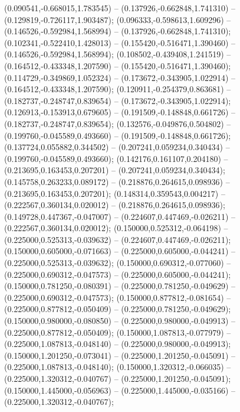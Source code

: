  (0.090541,-0.668015,1.783545) -- (0.137926,-0.662848,1.741310) -- (0.129819,-0.726117,1.903487);
 (0.096333,-0.598613,1.609296) -- (0.146526,-0.592984,1.568994) -- (0.137926,-0.662848,1.741310);
 (0.102341,-0.522410,1.428013) -- (0.155420,-0.516471,1.390460) -- (0.146526,-0.592984,1.568994);
 (0.108502,-0.439408,1.241519) -- (0.164512,-0.433348,1.207590) -- (0.155420,-0.516471,1.390460);
 (0.114729,-0.349869,1.052324) -- (0.173672,-0.343905,1.022914) -- (0.164512,-0.433348,1.207590);
 (0.120911,-0.254379,0.863681) -- (0.182737,-0.248747,0.839654) -- (0.173672,-0.343905,1.022914);
 (0.126913,-0.153913,0.679605) -- (0.191509,-0.148848,0.661726) -- (0.182737,-0.248747,0.839654);
 (0.132576,-0.049876,0.504802) -- (0.199760,-0.045589,0.493660) -- (0.191509,-0.148848,0.661726);
 (0.137724,0.055882,0.344502) -- (0.207241,0.059234,0.340434) -- (0.199760,-0.045589,0.493660);
 (0.142176,0.161107,0.204180) -- (0.213695,0.163453,0.207201) -- (0.207241,0.059234,0.340434);
 (0.145758,0.263233,0.089172) -- (0.218876,0.264615,0.098936) -- (0.213695,0.163453,0.207201);
 (0.148314,0.359543,0.004217) -- (0.222567,0.360134,0.020012) -- (0.218876,0.264615,0.098936);
 (0.149728,0.447367,-0.047007) -- (0.224607,0.447469,-0.026211) -- (0.222567,0.360134,0.020012);
 (0.150000,0.525312,-0.064198) -- (0.225000,0.525313,-0.039632) -- (0.224607,0.447469,-0.026211);
 (0.150000,0.605000,-0.071663) -- (0.225000,0.605000,-0.044241) -- (0.225000,0.525313,-0.039632);
 (0.150000,0.690312,-0.077060) -- (0.225000,0.690312,-0.047573) -- (0.225000,0.605000,-0.044241);
 (0.150000,0.781250,-0.080391) -- (0.225000,0.781250,-0.049629) -- (0.225000,0.690312,-0.047573);
 (0.150000,0.877812,-0.081654) -- (0.225000,0.877812,-0.050409) -- (0.225000,0.781250,-0.049629);
 (0.150000,0.980000,-0.080850) -- (0.225000,0.980000,-0.049913) -- (0.225000,0.877812,-0.050409);
 (0.150000,1.087813,-0.077979) -- (0.225000,1.087813,-0.048140) -- (0.225000,0.980000,-0.049913);
 (0.150000,1.201250,-0.073041) -- (0.225000,1.201250,-0.045091) -- (0.225000,1.087813,-0.048140);
 (0.150000,1.320312,-0.066035) -- (0.225000,1.320312,-0.040767) -- (0.225000,1.201250,-0.045091);
 (0.150000,1.445000,-0.056963) -- (0.225000,1.445000,-0.035166) -- (0.225000,1.320312,-0.040767);

